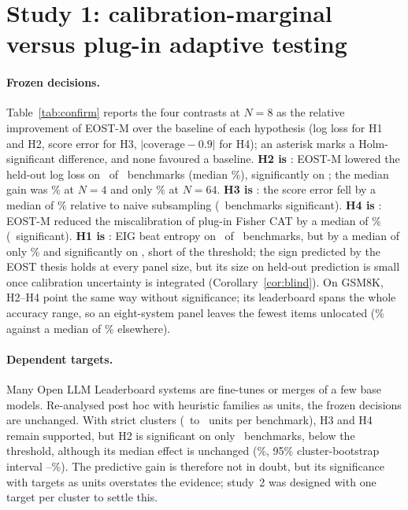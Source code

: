 \section{Study 1: calibration-marginal versus plug-in adaptive testing}
\label{sec:study1}

\paragraph{Frozen decisions.} Table~\ref{tab:confirm} reports the four contrasts at $N=8$ as
the relative improvement of EOST-M over the baseline of each hypothesis (log loss for H1 and
H2, score error for H3, $|\mathrm{coverage}-0.9|$ for H4); an asterisk marks a
Holm-significant difference, and none favoured a baseline. \textbf{H2 is \DecHTwo}: EOST-M
lowered the held-out log loss on \PosHTwo\ of \NBHTwo\ benchmarks (median \MedImpHTwo\%),
significantly on \FavHTwo; the median gain was \MedImpHTwoNfour\% at $N=4$ and only
\MedImpHTwoNsixtyfour\% at $N=64$. \textbf{H3 is \DecHThree}: the score error fell by a
median of \MedImpHThree\% relative to naive subsampling (\FavHThree\ benchmarks
significant). \textbf{H4 is \DecHFour}: EOST-M reduced the miscalibration of plug-in
Fisher CAT by a median of \MedImpHFour\% (\FavHFour\ significant). \textbf{H1 is
\DecHOne}: EIG beat entropy on \PosHOne\ of \NBHOne\ benchmarks, but by a median of only
\MedImpHOne\% and significantly on \FavHOne, short of the threshold; the sign predicted by
the EOST thesis holds at every panel size, but its size on held-out prediction is small once
calibration uncertainty is integrated (Corollary~\ref{cor:blind}). On GSM8K, H2--H4 point
the same way without significance; its leaderboard spans the whole accuracy range, so an
eight-system panel leaves the fewest items unlocated (\GsmFracExtremeNeight\% against a median
of \OtherFracExtremeNeight\% elsewhere).



\paragraph{Dependent targets.} Many Open LLM Leaderboard systems are fine-tunes or merges of
a few base models. Re-analysed post hoc with heuristic families as units, the frozen
decisions are unchanged. With strict clusters (\CluStrictUnitsMin\ to \CluStrictUnitsMax\
units per benchmark), H3 and H4 remain supported, but H2 is significant on only
\CluHTwoStrFav\ benchmarks, below the threshold, although its median effect is unchanged
(\CluHTwoStrMed\%, 95\% cluster-bootstrap interval \CluHTwoCILo--\CluHTwoCIHi\%). The
predictive gain is therefore not in doubt, but its significance with targets as units
overstates the evidence; study~2 was designed with one target per cluster to settle this.


